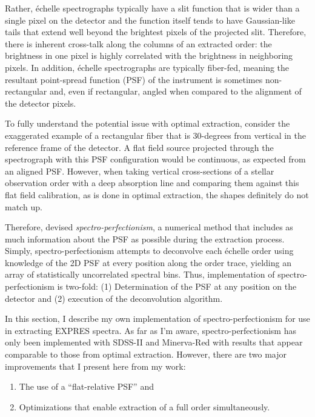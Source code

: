 Rather, \'{e}chelle spectrographs typically have a slit function that is wider than a single pixel on the detector and the function itself tends to have Gaussian-like tails that extend well beyond the brightest pixels of the projected slit. Therefore, there is inherent cross-talk along the columns of an extracted order: the brightness in one pixel is highly correlated with the brightness in neighboring pixels. In addition, \'{e}chelle spectrographs are typically fiber-fed, meaning the resultant point-spread function (PSF) of the instrument is sometimes non-rectangular and, even if rectangular, angled when compared to the alignment of the detector pixels.

To fully understand the potential issue with optimal extraction, consider the exaggerated example of a rectangular fiber that is 30-degrees from vertical in the reference frame of the detector. A flat field source projected through the spectrograph with this PSF configuration would be continuous, as expected from an aligned PSF. However, when taking vertical cross-sections of a stellar observation order with a deep absorption line and comparing them against this flat field calibration, as is done in optimal extraction, the shapes definitely do not match up.

Therefore, \citet{bolton_spectro-perfectionism_2009} devised \textit{spectro-perfectionism}, a numerical method that includes as much information about the PSF as possible during the extraction process. Simply, spectro-perfectionism attempts to deconvolve each \'{e}chelle order using knowledge of the 2D PSF at every position along the order trace, yielding an array of statistically uncorrelated spectral bins. Thus, implementation of spectro-perfectionism is two-fold: (1) Determination of the PSF at any position on the detector and (2) execution of the deconvolution algorithm.

In this section, I describe my own implementation of spectro-perfectionism for use in extracting EXPRES spectra. As far as I'm aware, spectro-perfectionism has only been implemented with SDSS-II \citep{bolton_spectro-perfectionism_2009} and Minerva-Red \citep{cornachione_full_2019} with results that appear comparable to those from optimal extraction. However, there are two major improvements that I present here from my work:
\begin{enumerate}
    \item The use of a ``flat-relative PSF'' and
    \item Optimizations that enable extraction of a full order simultaneously.
\end{enumerate}

